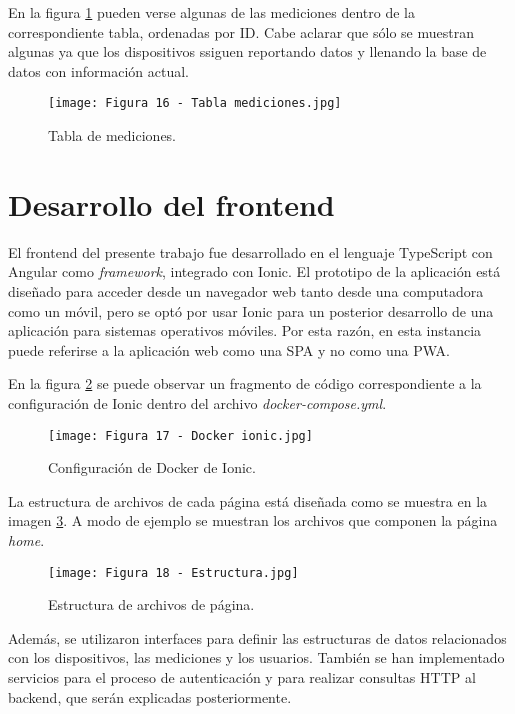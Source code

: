 En la figura \ref{fig:16} pueden verse algunas de las mediciones dentro de la correspondiente tabla, ordenadas por ID. Cabe aclarar que sólo se muestran algunas ya que los dispositivos ssiguen reportando datos y llenando la base de datos con información actual.

\begin{figure}[h]
\centering
\texttt{[image: Figura 16 - Tabla mediciones.jpg]}
\caption[Tabla mediciones]{Tabla de mediciones. \footnotemark}
\label{fig:16}
\end{figure}

\section{Desarrollo del frontend}

El frontend del presente trabajo fue desarrollado en el lenguaje TypeScript con Angular como \textit{framework}, integrado con Ionic. El prototipo de la aplicación está diseñado para acceder desde un navegador web tanto desde una computadora como un móvil, pero se optó por usar Ionic para un posterior desarrollo de una aplicación para sistemas operativos móviles. Por esta razón, en esta instancia puede referirse a la aplicación web como una SPA y no como una PWA.

En la figura \ref{fig:17} se puede observar un fragmento de código correspondiente a la configuración de Ionic dentro del archivo \textit{docker-compose.yml}.

\begin{figure}[h]
\centering
\texttt{[image: Figura 17 - Docker ionic.jpg]}
\caption[Configuración Ionic]{Configuración de Docker de Ionic. \footnotemark}
\label{fig:17}
\end{figure}

La estructura de archivos de cada página está diseñada como se muestra en la imagen \ref{fig:18}. A modo de ejemplo se muestran los archivos que componen la página \textit{home}.

\begin{figure}[h]
\centering
\texttt{[image: Figura 18 - Estructura.jpg]}
\caption[Estructura página]{Estructura de archivos de página. \footnotemark}
\label{fig:18}
\end{figure}

Además, se utilizaron interfaces para definir las estructuras de datos relacionados con los dispositivos, las mediciones y los usuarios. También se han implementado servicios para el proceso de autenticación y para realizar consultas HTTP al backend, que serán explicadas posteriormente.

